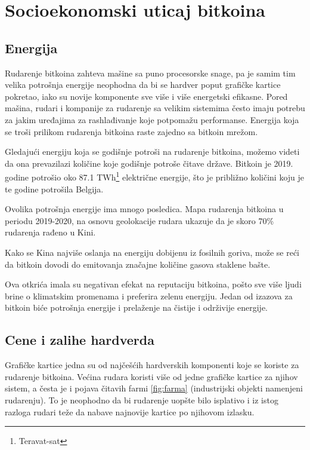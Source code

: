 \documentclass[a4paper]{article}
\begin{document}
\section{Socioekonomski uticaj bitkoina}

\subsection{Energija}

Rudarenje bitkoina zahteva mašine sa puno procesorske snage, pa je samim tim velika potrošnja energije neophodna da bi se hardver poput grafičke kartice pokretao, iako su novije komponente sve više i više energetski efikasne. Pored mašina, rudari i kompanije za rudarenje sa velikim sistemima često imaju potrebu za jakim uređajima za rashlađivanje koje potpomažu performanse. Energija koja se troši prilikom rudarenja bitkoina raste zajedno sa bitkoin mrežom.

Gledajući energiju koja se godišnje potroši na rudarenje bitkoina, možemo videti da ona prevazilazi količine koje godišnje potroše čitave države. Bitkoin je 2019. godine potrošio oko 87.1 TWh\footnote{Teravat-sat} električne energije, što je približno količini koju je te godine potrošila Belgija.  \cite{energijapotrosnja}


Ovolika potrošnja energije ima mnogo posledica. Mapa rudarenja bitkoina u periodu 2019-2020, na osnovu geolokacije rudara ukazuje da je skoro 70\% rudarenja rađeno u Kini. \cite{energijakina}

Kako se Kina najviše oslanja na energiju dobijenu iz fosilnih goriva, može se reći da bitkoin dovodi do emitovanja značajne količine gasova staklene bašte.

Ova otkrića imala su negativan efekat na reputaciju bitkoina, pošto sve više ljudi brine o klimatskim promenama i preferira zelenu energiju. Jedan od izazova za bitkoin biće potrošnja energije i prelaženje na čistije i održivije energije.


\subsection{Cene i zalihe hardverda }

Grafičke kartice jedna su od najčešćih hardverskih komponenti koje se koriste za rudarenje bitkoina. Većina rudara koristi više od jedne grafičke kartice za njihov sistem, a česta je i pojava čitavih farmi \ref{fig:farma} (industrijski objekti namenjeni rudarenju). To je neophodno da bi rudarenje uopšte bilo isplativo i iz istog razloga rudari teže da nabave najnovije kartice po njihovom izlasku.
\end{document}
